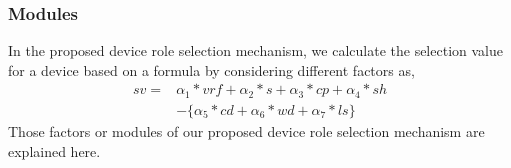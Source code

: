 \begin{table}[]
\caption{Notations used in Algorithm \ref{alg:role_mechanism}}
    \label{tab:notataions_role_mechanism}
    \centering
\end{table}

\subsubsection{Modules}
In the proposed device role selection mechanism, we calculate the selection value for a device based on 
a formula by considering different factors as, 
\begin{equation} \label{eqn:role_formula}
  \begin{aligned}
  sv = & \alpha_1 * vrf + \alpha_2 * s + \alpha_3 * cp  + \alpha_4 * sh \\
      & - \bigg\{ \alpha_5 * cd + \alpha_6 * wd + \alpha_7 * ls \bigg\}
  \end{aligned}
  \end{equation}
Those factors or modules of our proposed device role selection mechanism are explained here.

